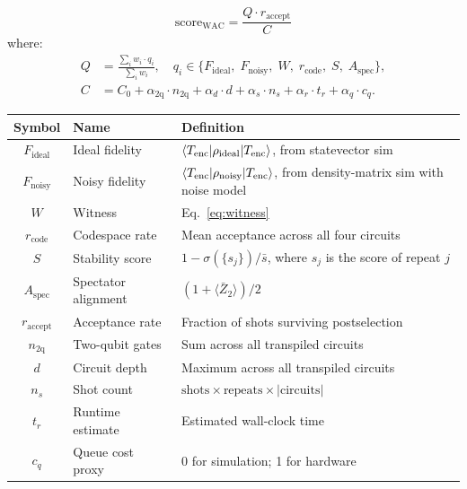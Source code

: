 \documentclass[11pt,a4paper]{article}
\newcommand{\expect}[1]{\langle #1 \rangle}
\begin{document}
\begin{equation}
  \text{score}_{\text{WAC}}
    = \frac{Q \cdot r_{\text{accept}}}{\;C\;}
  \label{eq:wac}
\end{equation}
where:
\begin{align}
  Q &= \frac{\sum_{i} w_i \cdot q_i}{\sum_{i} w_i},
    \quad q_i \in \{F_{\text{ideal}},\; F_{\text{noisy}},\; W,\; r_{\text{code}},\; S,\; A_{\text{spec}}\},
  \label{eq:quality} \\[4pt]
  C &= C_0 + \alpha_{\text{2q}} \cdot n_{\text{2q}} + \alpha_d \cdot d +
       \alpha_s \cdot n_s + \alpha_r \cdot t_r + \alpha_q \cdot c_q.
  \label{eq:cost}
\end{align}

\begin{center}
\begin{tabular}{clp{7.5cm}}
\toprule
\textbf{Symbol} & \textbf{Name} & \textbf{Definition} \\
\midrule
$F_{\text{ideal}}$ & Ideal fidelity & $\braket{T_{\text{enc}} | \rho_{\text{ideal}} | T_{\text{enc}}}$, from statevector sim \\
$F_{\text{noisy}}$ & Noisy fidelity & $\braket{T_{\text{enc}} | \rho_{\text{noisy}} | T_{\text{enc}}}$, from density-matrix sim with noise model \\
$W$ & Witness & Eq.~\eqref{eq:witness} \\
$r_{\text{code}}$ & Codespace rate & Mean acceptance across all four circuits \\
$S$ & Stability score & $1 - \sigma(\{s_j\}) / \bar{s}$, where $s_j$ is the score of repeat $j$ \\
$A_{\text{spec}}$ & Spectator alignment & $(1 + \expect{\bar{Z}_2})/2$ \\
$r_{\text{accept}}$ & Acceptance rate & Fraction of shots surviving postselection \\
$n_{\text{2q}}$ & Two-qubit gates & Sum across all transpiled circuits \\
$d$ & Circuit depth & Maximum across all transpiled circuits \\
$n_s$ & Shot count & $\text{shots} \times \text{repeats} \times |\text{circuits}|$ \\
$t_r$ & Runtime estimate & Estimated wall-clock time \\
$c_q$ & Queue cost proxy & 0 for simulation; 1 for hardware \\
\bottomrule
\end{tabular}
\end{center}
\end{document}
